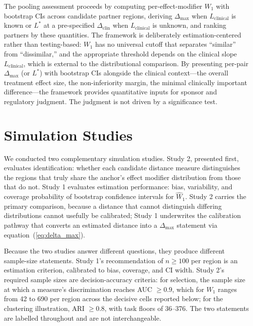 \documentclass[AMA,Times1COL]{WileyNJDv5}
\begin{document}
The pooling assessment proceeds by computing per-effect-modifier $W_1$ with bootstrap CIs across candidate partner regions, deriving $\Delta_{\max}$ when $L_{\text{clinical}}$ is known or $L^*$ at a pre-specified $\Delta_{\text{clin}}$ when $L_{\text{clinical}}$ is unknown, and ranking partners by these quantities. The framework is deliberately estimation-centered rather than testing-based: $W_1$ has no universal cutoff that separates ``similar'' from ``dissimilar,'' and the appropriate threshold depends on the clinical slope $L_{\text{clinical}}$, which is external to the distributional comparison. By presenting per-pair $\Delta_{\max}$ (or $L^*$) with bootstrap CIs alongside the clinical context---the overall treatment effect size, the non-inferiority margin, the minimal clinically important difference---the framework provides quantitative inputs for sponsor and regulatory judgment. The judgment is not driven by a significance test.\cite{wasserstein2016}

\section{Simulation Studies}\label{sec:simulation}

We conducted two complementary simulation studies. Study 2, presented first, evaluates identification: whether each candidate distance measure distinguishes the regions that truly share the anchor's effect modifier distribution from those that do not. Study 1 evaluates estimation performance: bias, variability, and coverage probability of bootstrap confidence intervals for $\widehat{W}_1$. Study 2 carries the primary comparison, because a distance that cannot distinguish differing distributions cannot usefully be calibrated; Study 1 underwrites the calibration pathway that converts an estimated distance into a $\Delta_{\max}$ statement via equation~(\ref{eq:delta_max}).

Because the two studies answer different questions, they produce different sample-size statements. Study 1's recommendation of $n \geq 100$ per region is an estimation criterion, calibrated to bias, coverage, and CI width. Study 2's required sample sizes are decision-accuracy criteria: for selection, the sample size at which a measure's discrimination reaches AUC $\geq 0.9$, which for $\widehat{W}_1$ ranges from 42 to 690 per region across the decisive cells reported below; for the clustering illustration, ARI $\geq 0.8$, with task floors of 36--376. The two statements are labelled throughout and are not interchangeable.
\end{document}
